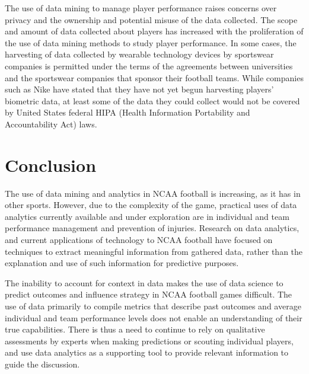 \documentclass[sigconf]{acmart}
\begin{document}
The use of data mining to manage player performance raises concerns over privacy and the ownership and potential misuse of the data collected\cite{Taylor2017}. The scope and amount of data collected about players has increased with the proliferation of the use of data mining methods to study player performance. In some cases, the harvesting of data collected by wearable technology devices by sportswear companies is permitted under the terms of the agreements between universities and the sportswear companies that sponsor their football teams. While companies such as Nike have stated that they have not yet begun harvesting players' biometric data, at least some of the data they could collect would not be covered by United States federal HIPA (Health Information Portability and Accountability Act) laws\cite{Tracy2016}.


\section{Conclusion}
The use of data mining and analytics in NCAA football is increasing, as it has in other sports. However, due to the complexity of the game, practical uses of data analytics currently available and under exploration are in individual and team performance management and prevention of injuries. Research on data analytics, and current applications of technology to NCAA football have focused on techniques to extract meaningful information from gathered data, rather than the explanation and use of such information for predictive purposes. 

The inability to account for context in data makes the use of data science to predict outcomes and influence strategy in NCAA football games difficult. The use of data primarily to compile metrics that describe past outcomes and average individual and team performance levels does not enable an understanding of their true capabilities. There is thus a need to continue to rely on qualitative assessments by experts when making predictions or scouting individual players, and use data analytics as a supporting tool to provide relevant information to guide the discussion.

 
\end{document}

